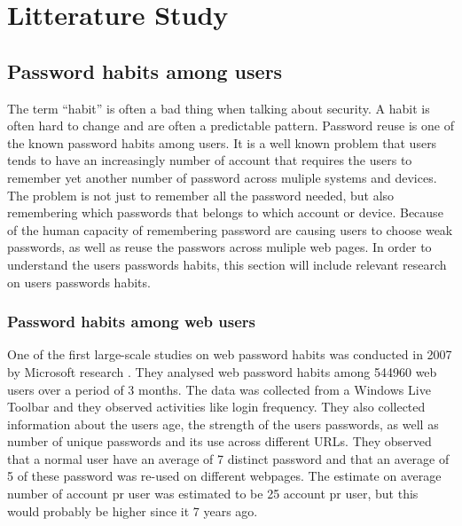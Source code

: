 
\chapter{Litterature Study}

  \section{Password habits among users}

    The term ``habit'' is often a bad thing when talking about security. A habit is often hard to change and are often a predictable pattern. Password reuse is one of the known password habits among users. It is a well known problem that users tends to have an increasingly number of account that requires the users to remember yet another number of password across muliple systems and devices. The problem is not just to remember all the password needed, but also remembering which passwords that belongs to which account or device. Because of the human capacity of remembering password are causing users to choose weak passwords, as well as reuse the passwors across muliple web pages. In order to understand the users passwords habits, this section will include relevant research on users passwords habits.

    \subsection{Password habits among web users}


    One of the first large-scale studies on web password habits was conducted in 2007 by Microsoft research \cite{habits1}. They analysed web password habits among 544960 web users over a period of 3 months. The data was collected from a Windows Live Toolbar and they observed activities like login frequency. They also collected information about the users age, the strength of the users passwords, as well as number of unique passwords and its use across different URLs. They observed that a normal user have an average of 7 distinct password and that an average of 5 of these password was re-used on different webpages. The estimate on average number of account pr user was estimated to be 25 account pr user, but this would probably be higher since it 7 years ago. 

